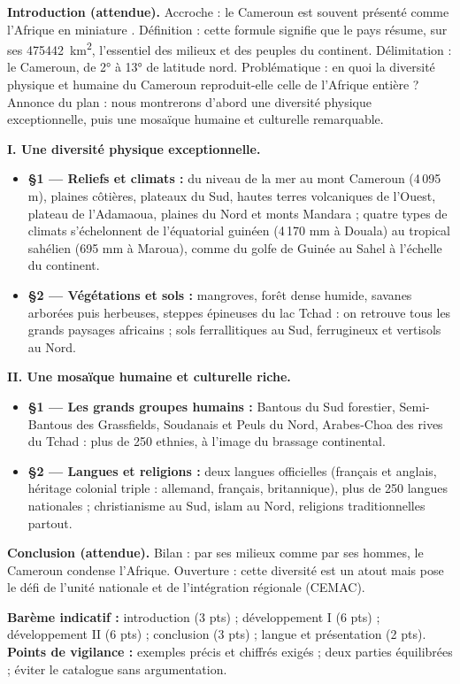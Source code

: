 \documentclass[11pt]{article}
\begin{document}
\begin{corrige}
\textbf{Introduction (attendue).} Accroche : le Cameroun est souvent présenté comme l'\og Afrique en miniature \fg. Définition : cette formule signifie que le pays résume, sur ses \SI{475442}{km^2}, l'essentiel des milieux et des peuples du continent. Délimitation : le Cameroun, de 2° à 13° de latitude nord. Problématique : en quoi la diversité physique et humaine du Cameroun reproduit-elle celle de l'Afrique entière ? Annonce du plan : nous montrerons d'abord une diversité physique exceptionnelle, puis une mosaïque humaine et culturelle remarquable.

\textbf{I. Une diversité physique exceptionnelle.}
\begin{itemize}
\item \textbf{§1 — Reliefs et climats :} du niveau de la mer au mont Cameroun (4\,095 m), plaines côtières, plateaux du Sud, hautes terres volcaniques de l'Ouest, plateau de l'Adamaoua, plaines du Nord et monts Mandara ; quatre types de climats s'échelonnent de l'équatorial guinéen (4\,170 mm à Douala) au tropical sahélien (695 mm à Maroua), comme du golfe de Guinée au Sahel à l'échelle du continent.
\item \textbf{§2 — Végétations et sols :} mangroves, forêt dense humide, savanes arborées puis herbeuses, steppes épineuses du lac Tchad : on retrouve tous les grands paysages africains ; sols ferrallitiques au Sud, ferrugineux et vertisols au Nord.
\end{itemize}
\textbf{II. Une mosaïque humaine et culturelle riche.}
\begin{itemize}
\item \textbf{§1 — Les grands groupes humains :} Bantous du Sud forestier, Semi-Bantous des Grassfields, Soudanais et Peuls du Nord, Arabes-Choa des rives du Tchad : plus de 250 ethnies, à l'image du brassage continental.
\item \textbf{§2 — Langues et religions :} deux langues officielles (français et anglais, héritage colonial triple : allemand, français, britannique), plus de 250 langues nationales ; christianisme au Sud, islam au Nord, religions traditionnelles partout.
\end{itemize}
\textbf{Conclusion (attendue).} Bilan : par ses milieux comme par ses hommes, le Cameroun condense l'Afrique. Ouverture : cette diversité est un atout mais pose le défi de l'unité nationale et de l'intégration régionale (CEMAC).

\textbf{Barème indicatif :} introduction (3 pts) ; développement I (6 pts) ; développement II (6 pts) ; conclusion (3 pts) ; langue et présentation (2 pts).
\textbf{Points de vigilance :} exemples précis et chiffrés exigés ; deux parties équilibrées ; éviter le catalogue sans argumentation.
\end{corrige}
\end{document}

